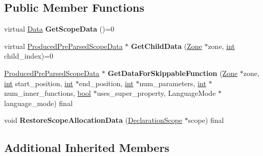 \subsection*{Public Member Functions}
\begin{DoxyCompactItemize}
\item 
\mbox{\label{classv8_1_1internal_1_1BaseConsumedPreParsedScopeData_a500411d300c9568e45656739a42cc3a1}} 
virtual \mbox{\hyperlink{classv8_1_1Data}{Data}} {\bfseries Get\+Scope\+Data} ()=0
\item 
\mbox{\label{classv8_1_1internal_1_1BaseConsumedPreParsedScopeData_a89938ba36ec2b5abe3819e824ea0c8df}} 
virtual \mbox{\hyperlink{classv8_1_1internal_1_1ProducedPreParsedScopeData}{Produced\+Pre\+Parsed\+Scope\+Data}} $\ast$ {\bfseries Get\+Child\+Data} (\mbox{\hyperlink{classv8_1_1internal_1_1Zone}{Zone}} $\ast$zone, \mbox{\hyperlink{classint}{int}} child\+\_\+index)=0
\item 
\mbox{\label{classv8_1_1internal_1_1BaseConsumedPreParsedScopeData_ac286e87447e05047468276a768dd6c71}} 
\mbox{\hyperlink{classv8_1_1internal_1_1ProducedPreParsedScopeData}{Produced\+Pre\+Parsed\+Scope\+Data}} $\ast$ {\bfseries Get\+Data\+For\+Skippable\+Function} (\mbox{\hyperlink{classv8_1_1internal_1_1Zone}{Zone}} $\ast$zone, \mbox{\hyperlink{classint}{int}} start\+\_\+position, \mbox{\hyperlink{classint}{int}} $\ast$end\+\_\+position, \mbox{\hyperlink{classint}{int}} $\ast$num\+\_\+parameters, \mbox{\hyperlink{classint}{int}} $\ast$num\+\_\+inner\+\_\+functions, \mbox{\hyperlink{classbool}{bool}} $\ast$uses\+\_\+super\+\_\+property, Language\+Mode $\ast$language\+\_\+mode) final
\item 
\mbox{\label{classv8_1_1internal_1_1BaseConsumedPreParsedScopeData_ac6505b4746d4b4cebcf2e499a7227d24}} 
void {\bfseries Restore\+Scope\+Allocation\+Data} (\mbox{\hyperlink{classv8_1_1internal_1_1DeclarationScope}{Declaration\+Scope}} $\ast$scope) final
\end{DoxyCompactItemize}
\subsection*{Additional Inherited Members}


